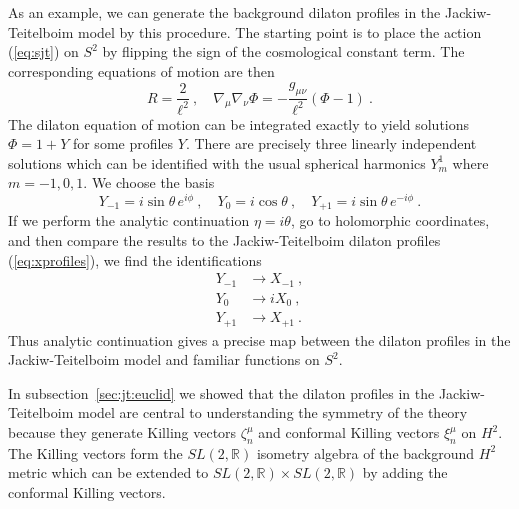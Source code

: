 \documentclass[12pt]{article}
\begin{document}
As an example, we can generate the background dilaton profiles in the Jackiw-Teitelboim model by this procedure.  The starting point is to place the action (\ref{eq:sjt}) on $S^2$ by flipping the sign of the cosmological constant term.  The corresponding equations of motion are then
\begin{equation}
	R = \frac{2}{\ell^2}~, \quad \nabla_\mu \nabla_\nu \Phi = -\frac{g_{\mu\nu}}{\ell^2} (\Phi - 1)~.
\end{equation}
The dilaton equation of motion can be integrated exactly to yield solutions $\Phi = 1 + Y$ for some profiles $Y$.  
There are precisely three linearly independent solutions which can be identified with the usual spherical harmonics $Y^1_m$ where $m=-1, 0, 1$. We choose the
basis 
\begin{equation}
	Y_{-1} = i \sin\theta\,e^{i\phi}~, \quad Y_0 = i \cos\theta~, \quad Y_{+1} = i \sin\theta\,e^{-i\phi}~.
\end{equation}
If we perform the analytic continuation $\eta = i \theta$, go to holomorphic coordinates, and then compare the results to the Jackiw-Teitelboim dilaton profiles (\ref{eq:xprofiles}), we find the identifications
\begin{equation}\begin{aligned}
	Y_{-1} &\rightarrow X_{-1}~, \\
	Y_{0} &\rightarrow i X_0~, \\
	Y_{+1} &\rightarrow X_{+1}~.
\label{eq:yxmap}
\end{aligned}\end{equation}
Thus analytic continuation gives a precise map between the dilaton profiles in the Jackiw-Teitelboim model and familiar functions on $S^2$.

In subsection~\ref{sec:jt:euclid} we showed that the dilaton profiles in the Jackiw-Teitelboim model are central to understanding the symmetry of the theory
because they generate Killing vectors $\zeta^\mu_n$ and conformal Killing vectors $\xi^\mu_n$ on $H^2$.  The Killing vectors form the $SL(2,\mathbb{R})$ isometry algebra of the background $H^2$ metric which can be extended to $SL(2,\mathbb{R}) \times SL(2,\mathbb{R})$ by adding the conformal Killing vectors.  
\end{document}
